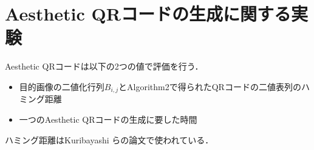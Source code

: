 \documentclass{thesis}
\begin{document}








\section{Aesthetic QRコードの生成に関する実験}

Aesthetic QRコードは以下の2つの値で評価を行う．

\begin{itemize}
\item 目的画像の二値化行列$B_{i,j}$とAlgorithm2で得られたQRコードの二値表列のハミング距離
\item 一つのAesthetic QRコードの生成に要した時間

\end{itemize}

ハミング距離はKuribayashi らの論文\cite{KURI}で使われている．

\end{document}
